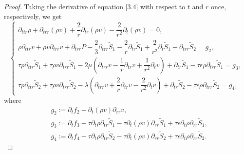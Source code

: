 \documentclass[10pt,a4paper]{amsart}
\begin{document}
	\begin{proof}
		Taking the derivative of equation \eqref{3.4} with respect to $t$ and $r$ once, respectively, we get
		\begin{equation}\label{47}
			\begin{cases}
				\partial_{ttr} \rho+\partial_{trr}(\rho v)+\dfrac{2}{r} \partial_{tr}(\rho v)-\dfrac{2}{r^2} \partial_{t}(\rho v)=0, \\
				\rho\partial_{ttr} v+\rho v \partial_{trr} v+\partial_{trr} P-\dfrac{2}{3}\partial_{trr}  \tilde{S}_1-\dfrac{2}{r} \partial_{tr} \tilde{S}_1+\dfrac{2}{r^2}\partial_{t}\tilde{S}_1-\partial_{trr} \tilde{S}_2=g_2,\\
				\tau \rho \partial_{ttr} \tilde{S}_1+\tau \rho v \partial_{trr}\tilde{S}_1 
				-2\mu\left(\partial_{trr} v- \dfrac{1}{r}\partial_{tr} v
				+\dfrac{1}{r^2} \partial_{t}v \right)+\partial_{tr} \tilde{S}_1
				-\tau \epsilon\rho\partial_{trr}\tilde{S}_1
				= g_3, \\
				\tau  \rho \partial_{ttr} \tilde{S}_2+\tau  \rho v \partial_{trr}\tilde{S}_2
				-\lambda \left(\partial_{trr} v+\dfrac{2}{r}\partial_{tr} v-\dfrac{2}{r^2} \partial_{t}v\right)+\partial_{tr} \tilde{S}_2
				-\tau  \epsilon\rho\partial_{trr}\tilde{S}_2
				=g_4,
			\end{cases}
		\end{equation}
		where
		\begin{equation}
			\begin{aligned}\nonumber
				&g_2:=\partial_{t}f_2-\partial_{t}(\rho v)\partial_{rr} v,\\
				&g_3:=\partial_{t}f_3
				-\tau \partial_{t}\rho \partial_{tr} \tilde{S}_1
				-\tau \partial_{t}(\rho v) \partial_{rr}\tilde{S}_1
				+\tau \epsilon\partial_{t}\rho\partial_{rr}\tilde{S}_1,\\
				&g_4:=\partial_{t}f_4-\tau  \partial_{t}\rho \partial_{tr} \tilde{S}_2-\tau  \partial_{t}(\rho v) \partial_{rr}\tilde{S}_2
				+\tau  \epsilon\partial_{t}\rho\partial_{rr}\tilde{S}_2.
			\end{aligned}
		\end{equation}
		

\end{proof}
\end{document}
